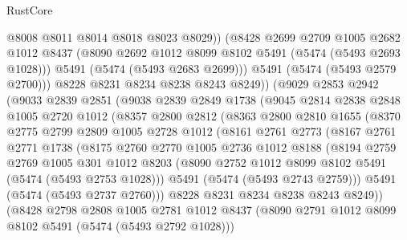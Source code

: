 \begin{lexlean}{RustCore}
\begin{coremodule}
                @8008
                @8011
                @8014
                @8018
                @8023
                @8029))
            (@8428
              @2699
              @2709
              @1005
              @2682
              @1012
              @8437
              (@8090 @2692 @1012 @8099 @8102 @5491 (@5474 (@5493 @2693 @1028)))
              @5491
              (@5474 (@5493 @2683 @2699)))
            @5491
            (@5474 (@5493 @2579 @2700)))
          @8228
          @8231
          @8234
          @8238
          @8243
          @8249))
      (@9029
        @2853
        @2942
        (@9033
          @2839
          @2851
          (@9038
            @2839
            @2849
            @1738
            (@9045
              @2814
              @2838
              @2848
              @1005
              @2720
              @1012
              (@8357
                @2800
                @2812
                (@8363
                  @2800
                  @2810
                  @1655
                  (@8370
                    @2775
                    @2799
                    @2809
                    @1005
                    @2728
                    @1012
                    (@8161
                      @2761
                      @2773
                      (@8167
                        @2761
                        @2771
                        @1738
                        (@8175
                          @2760
                          @2770
                          @1005
                          @2736
                          @1012
                          @8188
                          (@8194
                            @2759
                            @2769
                            @1005
                            @301
                            @1012
                            @8203
                            (@8090 @2752 @1012 @8099 @8102 @5491 (@5474 (@5493 @2753 @1028)))
                            @5491
                            (@5474 (@5493 @2743 @2759)))
                          @5491
                          (@5474 (@5493 @2737 @2760)))
                        @8228
                        @8231
                        @8234
                        @8238
                        @8243
                        @8249))
                    (@8428
                      @2798
                      @2808
                      @1005
                      @2781
                      @1012
                      @8437
                      (@8090 @2791 @1012 @8099 @8102 @5491 (@5474 (@5493 @2792 @1028)))

\end{coremodule}
\end{lexlean}

